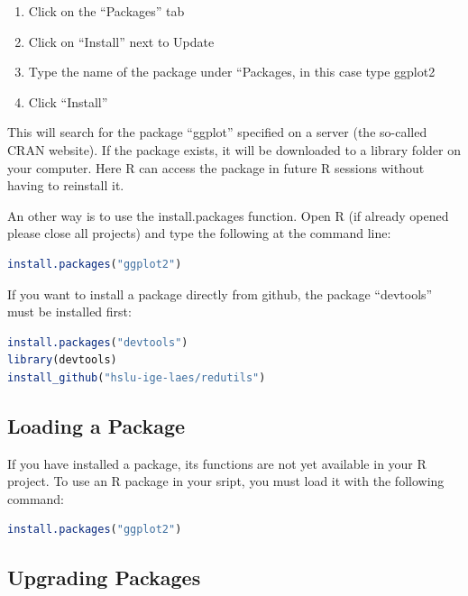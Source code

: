 \documentclass[
]{book}
\begin{document}
\begin{enumerate}
\def\labelenumi{\alph{enumi})}
\item
  Click on the ``Packages'' tab
\item
  Click on ``Install'' next to Update
\item
  Type the name of the package under ``Packages, in this case type ggplot2
\item
  Click ``Install''
\end{enumerate}

This will search for the package ``ggplot'' specified on a server (the so-called CRAN website). If the package exists, it will be downloaded to a library folder on your computer. Here R can access the package in future R sessions without having to reinstall it.

An other way is to use the install.packages function.
Open R (if already opened please close all projects) and type the following at the command line:

\begin{lstlisting}[language=R]
install.packages("ggplot2")
\end{lstlisting}

If you want to install a package directly from github, the package ``devtools'' must be installed first:

\begin{lstlisting}[language=R]
install.packages("devtools")
library(devtools)
install_github("hslu-ige-laes/redutils")
\end{lstlisting}

\hypertarget{loading-a-package}{%
\subsection{Loading a Package}\label{loading-a-package}}

If you have installed a package, its functions are not yet available in your R project. To use an R package in your sript, you must load it with the following command:

\begin{lstlisting}[language=R]
install.packages("ggplot2")
\end{lstlisting}

\hypertarget{upgrading-packages}{%
\subsection{Upgrading Packages}\label{upgrading-packages}}
\end{document}
